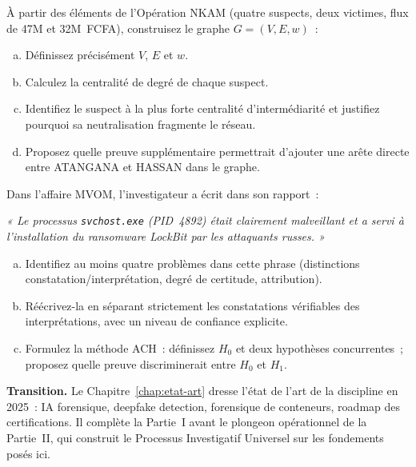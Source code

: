 \begin{boxexo}[title={\ding{45}\quad Exercice~4.2. Graphe NKAM \niveaumoyen}]
À partir des éléments de l'Opération NKAM (quatre suspects, deux victimes,
flux de 47M et 32M~FCFA), construisez le graphe $G = (V, E, w)$~:
\begin{enumerate}[(a)]
    \item Définissez précisément $V$, $E$ et $w$.
    \item Calculez la centralité de degré de chaque suspect.
    \item Identifiez le suspect à la plus forte centralité d'intermédiarité
          et justifiez pourquoi sa neutralisation fragmente le réseau.
    \item Proposez quelle preuve supplémentaire permettrait d'ajouter une
          arête directe entre ATANGANA et HASSAN dans le graphe.
\end{enumerate}
\end{boxexo}

\begin{boxexo}[title={\ding{45}\quad Exercice~4.3. Admissibilité et ACH \niveauexpert}]
Dans l'affaire MVOM, l'investigateur a écrit dans son rapport~:

\medskip
\textit{« Le processus \texttt{svchost.exe} (PID~4892) était clairement
malveillant et a servi à l'installation du ransomware LockBit par les
attaquants russes. »}
\medskip

\begin{enumerate}[(a)]
    \item Identifiez au moins quatre problèmes dans cette phrase (distinctions
          constatation/interprétation, degré de certitude, attribution).
    \item Réécrivez-la en séparant strictement les constatations vérifiables
          des interprétations, avec un niveau de confiance explicite.
    \item Formulez la méthode ACH~: définissez $H_0$ et deux hypothèses
          concurrentes~; proposez quelle preuve discriminerait entre $H_0$
          et $H_1$.
\end{enumerate}
\end{boxexo}

\bigskip

\begin{boxinfo}
\textbf{Transition.} Le Chapitre~\ref{chap:etat-art} dresse l'état de l'art
de la discipline en 2025~: IA forensique, deepfake detection, forensique de
conteneurs, roadmap des certifications. Il complète la Partie~I avant le
plongeon opérationnel de la Partie~II, qui construit le Processus Investigatif
Universel sur les fondements posés ici.
\end{boxinfo}
